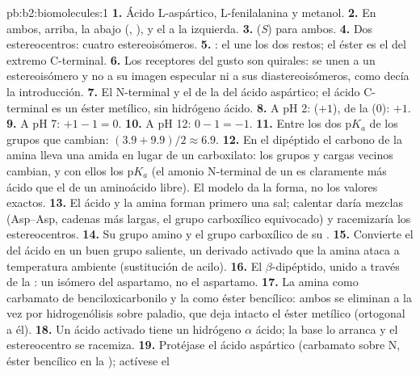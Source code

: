 \begin{solution}{pb:b2:biomolecules:1}
\textbf{1.} Ácido L-aspártico, L-fenilalanina y metanol.
\textbf{2.} En ambos,  arriba, la  abajo (, ), y el 
a la izquierda.
\textbf{3.} (\textit{S}) para ambos.
\textbf{4.} Dos estereocentros: cuatro estereoisómeros.
\textbf{5.} : el  une los dos
restos; el éster es el  del extremo C-terminal.
\textbf{6.} Los receptores del gusto son quirales: se unen a un estereoisómero y no a su imagen especular ni a sus
diastereoisómeros, como decía la introducción.
\textbf{7.} El  N-terminal y el  de la  del ácido aspártico; el ácido C-terminal
es un éster metílico, sin hidrógeno ácido.
\textbf{8.} A pH 2:  ($+1$),  de la  (0): $+1$.
\textbf{9.} A pH 7: $+1 - 1 = 0$.
\textbf{10.} A pH 12: $0 - 1 = -1$.
\textbf{11.} Entre los dos $\mathrm pK_a$ de los grupos que cambian: $(3.9 + 9.9)/2 \approx 6.9$.
\textbf{12.} En el dipéptido el carbono de la amina lleva una amida en lugar de un carboxilato: los
grupos y cargas vecinos cambian, y con ellos los $\mathrm pK_a$ (el amonio N-terminal de un
 es claramente más ácido que el de un aminoácido libre). El modelo da la forma, no los
valores exactos.
\textbf{13.} El ácido y la amina forman primero una sal; calentar daría mezclas (Asp--Asp, cadenas más largas,
el grupo carboxílico equivocado) y racemizaría los estereocentros.
\textbf{14.} Su grupo amino y el grupo carboxílico de su .
\textbf{15.} Convierte el  del ácido en un buen grupo saliente, un derivado activado que la
amina ataca a temperatura ambiente (sustitución de acilo).
\textbf{16.} El $\beta$-dipéptido, unido a través de la : un isómero del aspartamo, no el aspartamo.
\textbf{17.} La amina como carbamato de benciloxicarbonilo y la  como éster bencílico: ambos se
eliminan a la vez por hidrogenólisis sobre paladio, que deja intacto el éster metílico (ortogonal
a él).
\textbf{18.} Un ácido activado tiene un hidrógeno $\alpha$ ácido; la base lo arranca y el estereocentro
se racemiza.
\textbf{19.} Protéjase el ácido aspártico (carbamato sobre N, éster bencílico en la ); actívese el

\end{solution}
